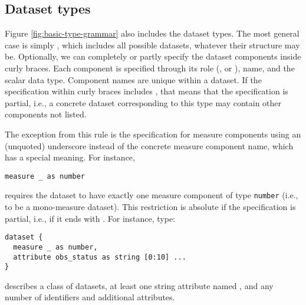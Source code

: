 \documentclass[droidmono,libertine,twoside,user,unofficial]{ecarticle}
\begin{document}


\subsection{Dataset types}
\label{sec:dataset-types}

Figure \ref{fig:basic-type-grammar} also includes the dataset types.
%
The most general case is simply , which includes all
possible datasets, whatever their structure may be.  Optionally, we
can completely or partly specify the dataset components inside curly
braces.  Each component is specified through its role
(,  or ), name, and the
scalar data type.  Component names are unique within a dataset.  If
the specification within curly braces includes , that means
that the specification is partial, i.e., a concrete dataset
corresponding to this type may contain other components not listed.

The exception from this rule is the specification for measure
components using an (unquoted) underscore instead of the concrete
measure component name, which has a special meaning.  For instance,
\begin{lstlisting}
measure _ as number
\end{lstlisting}
requires the dataset to have exactly one measure component of type
\texttt{number} (i.e., to be a mono-measure dataset).
%
This restriction is absolute if the specification is partial, i.e., if
it ends with .  For instance, type:
\begin{lstlisting}
dataset {
  measure _ as number,
  attribute obs_status as string [0:10] ...
}
\end{lstlisting}
describes a class of datasets, at least one string attribute named
, and any number of identifiers and additional
attributes.
\end{document}

